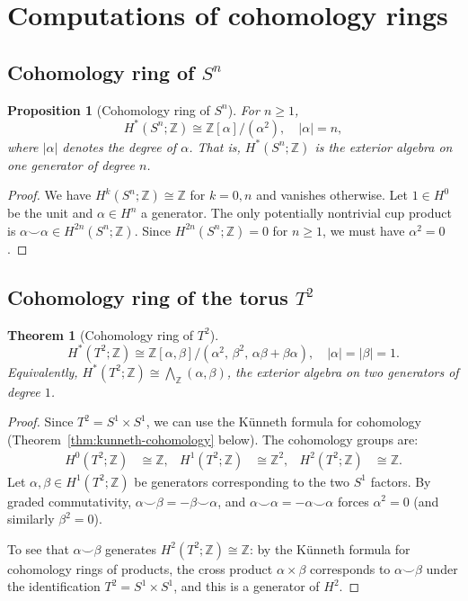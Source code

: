 \documentclass[12pt,a4paper,openany]{book}
\theoremstyle{definition}
\theoremstyle{plain}
\newtheorem{theorem}[definition]{Theorem}
\newtheorem{proposition}[definition]{Proposition}
\theoremstyle{remark}
\newcommand{\Z}{\mathbb{Z}}
\newcommand{\abs}[1]{\left|#1\right|}
\begin{document}
\section{Computations of cohomology rings}
\label{sec:cohomology-computations}

\subsection{Cohomology ring of $S^n$}
\label{subsec:coh-sphere}

\begin{proposition}[Cohomology ring of $S^n$]\label{prop:coh-ring-Sn}
For $n\geq 1$,
\[
  H^*(S^n;\Z) \cong \Z[\alpha]/(\alpha^2),
  \quad \abs{\alpha}=n,
\]
where $\abs{\alpha}$ denotes the degree of $\alpha$. That is,
$H^*(S^n;\Z)$ is the exterior algebra on one generator of degree $n$.
\end{proposition}

\begin{proof}
We have $H^k(S^n;\Z)\cong\Z$ for $k=0,n$ and vanishes otherwise.
Let $1\in H^0$ be the unit and $\alpha\in H^n$ a generator. The only
potentially nontrivial cup product is $\alpha\smile\alpha\in H^{2n}(S^n;\Z)$.
Since $H^{2n}(S^n;\Z)=0$ for $n\geq 1$, we must have $\alpha^2=0$.
\end{proof}

\subsection{Cohomology ring of the torus $T^2$}
\label{subsec:coh-torus}

\begin{theorem}[Cohomology ring of $T^2$]\label{thm:coh-ring-T2}
\[
  H^*(T^2;\Z) \cong \Z[\alpha,\beta]/(\alpha^2,\,\beta^2,\,
  \alpha\beta+\beta\alpha),
  \quad \abs{\alpha}=\abs{\beta}=1.
\]
Equivalently, $H^*(T^2;\Z)\cong\bigwedge_\Z(\alpha,\beta)$,
the exterior algebra on two generators of degree $1$.
\end{theorem}

\begin{proof}
Since $T^2=S^1\times S^1$, we can use the K\"unneth formula for
cohomology (Theorem~\ref{thm:kunneth-cohomology} below). The cohomology
groups are:
\begin{align*}
  H^0(T^2;\Z)&\cong\Z, &
  H^1(T^2;\Z)&\cong\Z^2, &
  H^2(T^2;\Z)&\cong\Z.
\end{align*}
Let $\alpha,\beta\in H^1(T^2;\Z)$ be generators corresponding to the
two $S^1$ factors. By graded commutativity,
$\alpha\smile\beta = -\beta\smile\alpha$, and
$\alpha\smile\alpha = -\alpha\smile\alpha$ forces $\alpha^2=0$
(and similarly $\beta^2=0$).

To see that $\alpha\smile\beta$ generates $H^2(T^2;\Z)\cong\Z$:
by the K\"unneth formula for cohomology rings of products, the cross
product $\alpha\times\beta$ corresponds to $\alpha\smile\beta$ under
the identification $T^2=S^1\times S^1$, and this is a generator of
$H^2$.
\end{proof}
\end{document}
